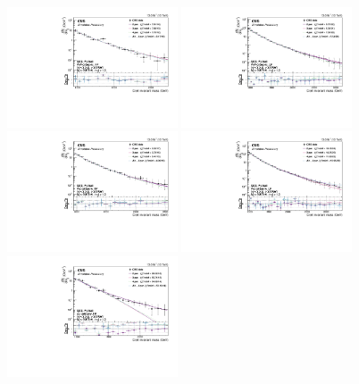 \begin{figure}[htb]
\centering
\includegraphics[width=0.45\textwidth]{figures/analysis/search2/AN-16-235/plots/WWHP_fitComp.pdf}
\includegraphics[width=0.45\textwidth]{figures/analysis/search2/AN-16-235/plots/WWLP_fitComp.pdf}\\
\includegraphics[width=0.45\textwidth]{figures/analysis/search2/AN-16-235/plots/WZHP_fitComp.pdf}
\includegraphics[width=0.45\textwidth]{figures/analysis/search2/AN-16-235/plots/WZLP_fitComp.pdf}\\
\includegraphics[width=0.45\textwidth]{figures/analysis/search2/AN-16-235/plots/ZZHP_fitComp.pdf}

\end{figure}
